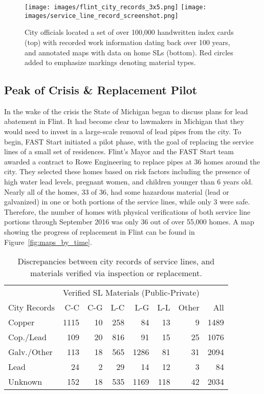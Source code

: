 \documentclass[sigconf]{acmart}
\begin{document}
\begin{figure}[!ht]
\begin{center}
\texttt{[image: images/flint\_city\_records\_3x5.png]}
\texttt{[image: images/service\_line\_record\_screenshot.png]}
\caption{City officials located a set of over 100,000 handwritten index cards (top) with recorded work information dating back over 100 years, and annotated maps with data on home SLs (bottom). Red circles added to emphasize markings denoting material types.} \label{fig:cityrecords}
\end{center}
\end{figure}


\subsection{Peak of Crisis \& Replacement Pilot}
\label{sec:deq-in-home-inspection}


In the wake of the crisis the State of Michigan began to discuss plans for lead abatement in Flint. It had become clear to lawmakers in Michigan that they would need to invest in a large-scale removal of lead pipes from the city. To begin, FAST Start initiated a pilot phase, with the goal of replacing the service lines of a small set of residences. Flint's Mayor and the FAST Start team awarded a contract to Rowe Engineering to replace pipes at 36 homes around the city. They selected these homes based on risk factors including the presence of high water lead levels, pregnant women, and children younger than 6 years old. Nearly all of the homes, 33 of 36, had some hazardous material (lead or galvanized) in one or both portions of the service lines, while only 3 were safe. Therefore, the number of homes with physical verifications of both service line portions through September 2016 was only 36 out of over 55,000 homes. A map showing the progress of replacement in Flint can be found in Figure~\ref{fig:maps_by_time}.



\begin{table}[h]
\centering
\small{
  \begin{tabular}{|lrrrrrrr|}
       \hline
    & \multicolumn{6}{l}{Verified SL Materials (Public-Private)} &  \\
    City   Records&   C-C&   C-G&   L-C&   L-G&   L-L& Other&  All  \\ \hline
            Copper&  1115&    10&   258&    84&    13&     9&  1489 \\
         Cop./Lead&   109&    20&   816&    91&    15&    25&  1076 \\
       Galv./Other&   113&    18&   565&  1286&    81&    31&  2094 \\
              Lead&    24&     2&    29&    14&    12&     3&    84 \\
           Unknown&   152&    18&   535&  1169&   118&    42&  2034 \\
              \hline
  \end{tabular}
}
\caption{
  Discrepancies between city records of service lines, and materials verified via inspection or replacement.
}\label{tbl:sl-records-vs-truth-slr-hvi}
\end{table}
\end{document}
